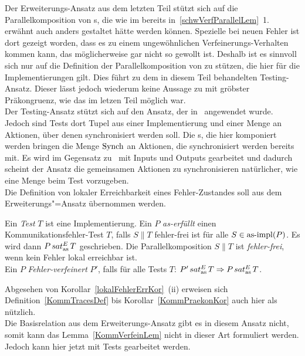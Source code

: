 Der Erweiterungs-Ansatz aus dem letzten Teil stützt sich auf die
Parallelkomposition von \MEIO{}s, die wie im bereits
in~\ref{schwVerfParallelLem}~1. erwähnt auch anders gestaltet hätte werden
können. Spezielle bei neuen Fehler ist dort gezeigt worden, dass es zu einem
ungewöhnlichen Verfeinerungs-Verhalten kommen kann, das möglicherweise gar
nicht so gewollt ist. Deshalb ist es sinnvoll sich nur auf die Definition der
Parallelkomposition von \EIO{} zu stützen, die hier für die Implementierungen
gilt. Dies führt zu dem in diesem Teil behandelten Testing-Ansatz. Dieser lässt
jedoch wiederum keine Aussage zu mit gröbster Präkongruenz, wie das im letzen
Teil möglich war.\\
Der Testing-Ansatz stützt sich auf den Ansatz, der in~\cite{Vogler2015FailSem}
angewendet wurde. Jedoch sind Tests dort Tupel aus einer Implementierung und
einer Menge an Aktionen, über denen synchronisiert werden soll. Die \MEIO{}s,
die hier komponiert werden bringen die Menge $\mathrm{Synch}$ an Aktionen, die
synchronisiert werden bereits mit. Es wird im Gegensatz
zu~\cite{Vogler2015FailSem} mit Inputs und Outputs gearbeitet und dadurch
scheint der Ansatz die gemeinsamen Aktionen zu synchronisieren natürlicher, wie
eine Menge beim Test vorzugeben.\\
Die Definition von lokaler Erreichbarkeit eines Fehler-Zustandes soll aus dem
Erweiterungs"=Ansatz übernommen werden.

\begin{Def}
  \label{KommTestDef}
  Ein \emph{Test} $T$ ist eine Implementierung. Ein \MEIO{} $P$
  \emph{as-erfüllt} einen Kommunikationsfehler-Test $T$, falls $S\|T$
  fehler-frei ist für alle $S\in \mathrm{as}\text{-}\mathrm{impl} (P)$. Es wird dann $P \hspace{0.05cm}sat_\mathrm{as}^E\hspace{0.05cm} T$
  geschrieben. Die Parallelkomposition $S\|T$ ist \emph{fehler-frei}, wenn kein
  Fehler lokal erreichbar ist.\\
  Ein \MEIO{} $P$ \emph{Fehler-verfeinert} $P'$, falls für alle Tests $T$:
  $P'\hspace{0.05cm}sat_\mathrm{as}^E\hspace{0.05cm} T \Rightarrow P\hspace{0.05cm}sat_\mathrm{as}^E\hspace{0.05cm} T$.
\end{Def}

Abgesehen von Korollar~\ref{lokalFehlerErrKor}~(ii) erweisen sich
Definition~\ref{KommTracesDef} bis Korollar~\ref{KommPraekonKor} auch hier als
nützlich.\\
Die Basisrelation aus dem Erweiterungs-Ansatz gibt es in diesem Ansatz nicht,
somit kann das Lemma~\ref{KommVerfeinLem} nicht in dieser Art formuliert
werden. Jedoch kann hier jetzt mit Tests gearbeitet werden.

